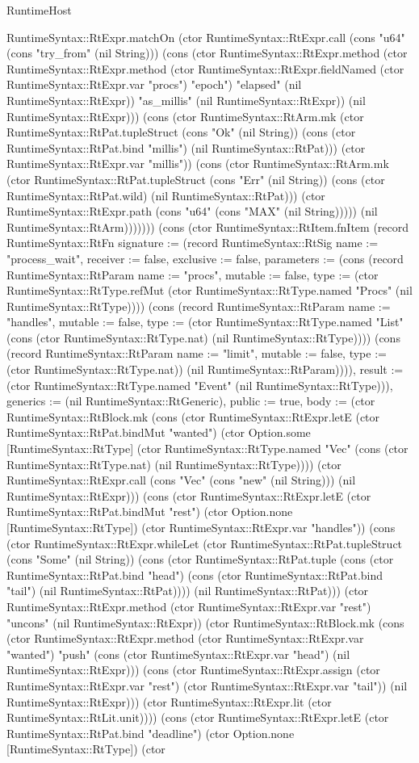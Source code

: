 \begin{lexlean}{RuntimeHost}
\begin{semanticmodule}
{RuntimeSyntax::RtExpr.matchOn (ctor RuntimeSyntax::RtExpr.call (cons "u64" (cons "try_from" (nil String))) (cons (ctor RuntimeSyntax::RtExpr.method (ctor RuntimeSyntax::RtExpr.method (ctor RuntimeSyntax::RtExpr.fieldNamed (ctor RuntimeSyntax::RtExpr.var "procs") "epoch") "elapsed" (nil RuntimeSyntax::RtExpr)) "as_millis" (nil RuntimeSyntax::RtExpr)) (nil RuntimeSyntax::RtExpr))) (cons (ctor RuntimeSyntax::RtArm.mk (ctor RuntimeSyntax::RtPat.tupleStruct (cons "Ok" (nil String)) (cons (ctor RuntimeSyntax::RtPat.bind "millis") (nil RuntimeSyntax::RtPat))) (ctor RuntimeSyntax::RtExpr.var "millis")) (cons (ctor RuntimeSyntax::RtArm.mk (ctor RuntimeSyntax::RtPat.tupleStruct (cons "Err" (nil String)) (cons (ctor RuntimeSyntax::RtPat.wild) (nil RuntimeSyntax::RtPat))) (ctor RuntimeSyntax::RtExpr.path (cons "u64" (cons "MAX" (nil String))))) (nil RuntimeSyntax::RtArm)))))})) (cons (ctor RuntimeSyntax::RtItem.fnItem (record RuntimeSyntax::RtFn {signature := (record RuntimeSyntax::RtSig {name := "process_wait", receiver := false, exclusive := false, parameters := (cons (record RuntimeSyntax::RtParam {name := "procs", mutable := false, type := (ctor RuntimeSyntax::RtType.refMut (ctor RuntimeSyntax::RtType.named "Procs" (nil RuntimeSyntax::RtType)))}) (cons (record RuntimeSyntax::RtParam {name := "handles", mutable := false, type := (ctor RuntimeSyntax::RtType.named "List" (cons (ctor RuntimeSyntax::RtType.nat) (nil RuntimeSyntax::RtType)))}) (cons (record RuntimeSyntax::RtParam {name := "limit", mutable := false, type := (ctor RuntimeSyntax::RtType.nat)}) (nil RuntimeSyntax::RtParam)))), result := (ctor RuntimeSyntax::RtType.named "Event" (nil RuntimeSyntax::RtType))}), generics := (nil RuntimeSyntax::RtGeneric), public := true, body := (ctor RuntimeSyntax::RtBlock.mk (cons (ctor RuntimeSyntax::RtExpr.letE (ctor RuntimeSyntax::RtPat.bindMut "wanted") (ctor Option.some [RuntimeSyntax::RtType] (ctor RuntimeSyntax::RtType.named "Vec" (cons (ctor RuntimeSyntax::RtType.nat) (nil RuntimeSyntax::RtType)))) (ctor RuntimeSyntax::RtExpr.call (cons "Vec" (cons "new" (nil String))) (nil RuntimeSyntax::RtExpr))) (cons (ctor RuntimeSyntax::RtExpr.letE (ctor RuntimeSyntax::RtPat.bindMut "rest") (ctor Option.none [RuntimeSyntax::RtType]) (ctor RuntimeSyntax::RtExpr.var "handles")) (cons (ctor RuntimeSyntax::RtExpr.whileLet (ctor RuntimeSyntax::RtPat.tupleStruct (cons "Some" (nil String)) (cons (ctor RuntimeSyntax::RtPat.tuple (cons (ctor RuntimeSyntax::RtPat.bind "head") (cons (ctor RuntimeSyntax::RtPat.bind "tail") (nil RuntimeSyntax::RtPat)))) (nil RuntimeSyntax::RtPat))) (ctor RuntimeSyntax::RtExpr.method (ctor RuntimeSyntax::RtExpr.var "rest") "uncons" (nil RuntimeSyntax::RtExpr)) (ctor RuntimeSyntax::RtBlock.mk (cons (ctor RuntimeSyntax::RtExpr.method (ctor RuntimeSyntax::RtExpr.var "wanted") "push" (cons (ctor RuntimeSyntax::RtExpr.var "head") (nil RuntimeSyntax::RtExpr))) (cons (ctor RuntimeSyntax::RtExpr.assign (ctor RuntimeSyntax::RtExpr.var "rest") (ctor RuntimeSyntax::RtExpr.var "tail")) (nil RuntimeSyntax::RtExpr))) (ctor RuntimeSyntax::RtExpr.lit (ctor RuntimeSyntax::RtLit.unit)))) (cons (ctor RuntimeSyntax::RtExpr.letE (ctor RuntimeSyntax::RtPat.bind "deadline") (ctor Option.none [RuntimeSyntax::RtType]) (ctor }
\end{semanticmodule}
\end{lexlean}
